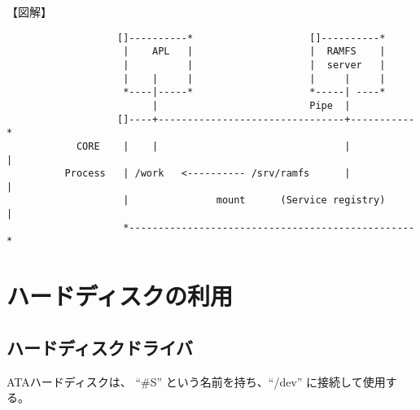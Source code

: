 【図解】\\
\begin{verbatim}
                   []----------*                    []----------*    
                    |    APL   |                    |  RAMFS    |    
                    |          |                    |  server   |    
                    |    |     |                    |     |     |    
                    *----|-----*                    *-----| ----*    
                         |                          Pipe  |          
                   []----+--------------------------------+-----------*               
            CORE    |    |                                |           | 
          Process   | /work   <---------- /srv/ramfs      |           | 
                    |               mount      (Service registry)     |
                    *-------------------------------------------------*                  
\end{verbatim}   
  

\chapter{ハードディスクの利用}

\section{ハードディスクドライバ}

      ATAハードディスクは、 ``\#S'' という名前を持ち、``/dev'' に接続して使用する。
\begin{comment}
    なお、「実マシン上で LP49 を動かしてみたいが、ハードディスクの内容を壊したくない」
    という場合には、ハードディスクドライバをはずしてコンパイルすればよい。
      src/pc/config-l4.c の中に、以下の定義がある。
    ここで、 \& sddevtab, をコメントアウトすれば、ハードディス
    クドライバは組み込まれない。

  \begin{verbatim}
      Dev  * devtab[ ] = {
            .......
           & sddevtab,     ← この行をコメントアウトればハードディスクドライバは除外される。
            ........
        }
  \end{verbatim}

  \section{LP49の名前空間とハードディスクの位置}
\end{comment}


